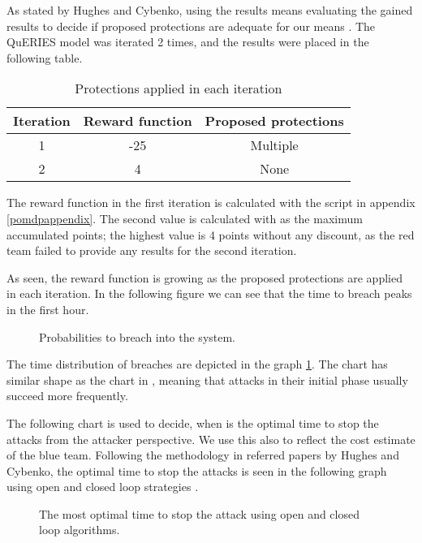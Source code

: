 As stated by Hughes and Cybenko, using the results means evaluating
the gained results to decide if proposed protections are adequate for
our means \cite{hughes2013quantitative}. The QuERIES model was
iterated 2 times, and the results were placed in the following table.

\begin{table}[h!]
\centering
\begin{tabular}{|c|c|c|}
  \hline Iteration & Reward function & Proposed protections \\ \hline
  1 & -25 & Multiple \\ \hline
  2 & 4 & None
  \\ \hline
\end{tabular}
\caption{Protections applied in each iteration}
\label{iterationtable}
\end{table}

The reward function in the first iteration is calculated with the
script in appendix \ref{pomdpappendix}. The second value is calculated
with as the maximum accumulated points; the highest value is 4 points
without any discount, as the red team failed to provide any results
for the second iteration.

As seen, the reward function is growing as the proposed protections
are applied in each iteration. In the following figure we can see that
the time to breach peaks in the first hour.

\begin{figure}[t!]
\centerline{}
\caption{Probabilities to breach into the system.}
\label{timetobreach}
\end{figure}

The time distribution of breaches are depicted in the graph
\ref{timetobreach}. The chart has similar shape as the chart in
\cite{carin2008cybersecurity}, meaning that attacks in their initial
phase usually succeed more frequently.

The following chart is used to decide, when is the optimal time to
stop the attacks from the attacker perspective. We use this also to
reflect the cost estimate of the blue team. Following the methodology
in referred papers by Hughes and Cybenko, the optimal time to stop the
attacks is seen in the following graph using open and closed loop
strategies \cite{hughes2013quantitative}.

\begin{figure}[t!]
\centerline{}
\caption{The most optimal time to stop the attack using open and
  closed loop algorithms.}
\label{openandclosed}
\end{figure}

